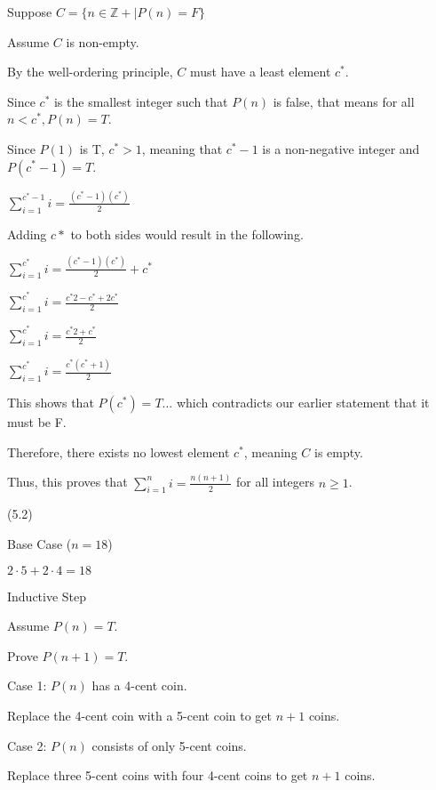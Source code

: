 \documentclass{exam}
\begin{document}
\begin{questions}
\begin{center}
Suppose \(C = \{n \in \mathbb{Z+} | P(n) = F\}\)

Assume \(C\) is non-empty.

By the well-ordering principle, \(C\) must have a least element \(c^*\).

Since \(c^*\) is the smallest integer such that \(P(n)\) is false, that means for all \(n < c^*, P(n) = T\).

Since \(P(1)\) is T, \(c^* > 1\), meaning that \(c^*-1\) is a non-negative integer and \(P(c^*-1) = T\).

\( \sum_{i=1}^{c^*-1} i = \frac{(c^*-1)(c^*)}{2} \)

Adding \(c*\) to both sides would result in the following.

\( \sum_{i=1}^{c^*} i = \frac{(c^*-1)(c^*)}{2} + c^* \)

\( \sum_{i=1}^{c^*} i = \frac{c^*2 - c^* + 2c^*}{2} \)

\( \sum_{i=1}^{c^*} i = \frac{c^*2 + c^*}{2} \)

\( \sum_{i=1}^{c^*} i = \frac{c^*(c^* + 1)}{2} \)

This shows that \(P(c^*) = T\)... which contradicts our earlier statement that it must be F.

Therefore, there exists no lowest element \(c^*\), meaning \(C\) is empty.

Thus, this proves that \( \sum_{i=1}^{n} i = \frac{n(n+1)}{2} \) for all integers \( n \geq 1 \).

\end{center}

 (5.2)

\begin{center}
Base Case (\(n = 18\))

\( 2 \cdot 5 + 2 \cdot 4 = 18 \)

\vspace{5px}

Inductive Step

Assume \( P(n) = T \).

Prove \( P(n+1) = T \).

Case 1: \(P(n)\) has a 4-cent coin.

Replace the 4-cent coin with a 5-cent coin to get \(n+1\) coins.
\vspace{5px}

Case 2: \(P(n)\) consists of only 5-cent coins.

Replace three 5-cent coins with four 4-cent coins to get \(n+1\) coins.


\end{center}
\end{questions}
\end{document}
